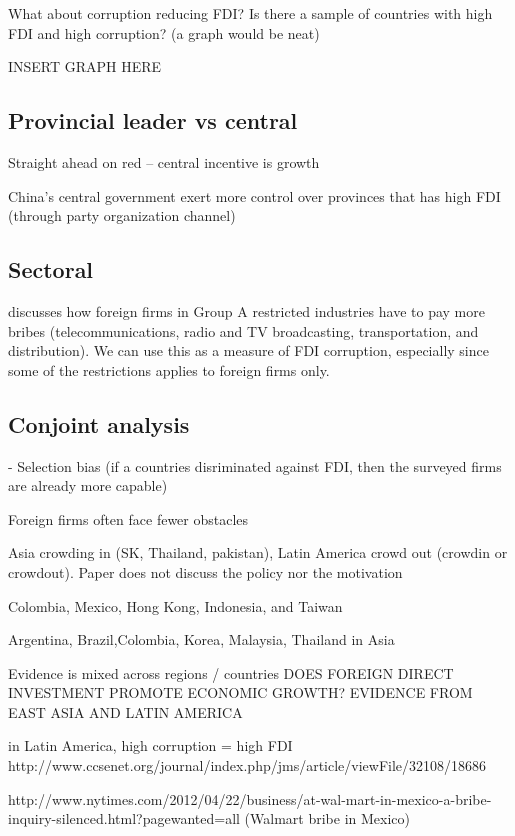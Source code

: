 \documentclass[12pt]{article}
\begin{document}
What about corruption reducing FDI? Is there a sample of countries with high FDI and high corruption? (a graph would be neat)

INSERT GRAPH HERE


\subsection{Provincial leader vs central}

\citep{Malesky2008} Straight ahead on red -- central incentive is growth

\citep{Sheng2007} China's central government exert more control over provinces that has high FDI (through party organization channel)

\subsection{Sectoral}

\citep{Malesky2015} discusses how foreign firms in Group A restricted industries have to pay more bribes (telecommunications, radio and TV broadcasting, transportation, and distribution). We can use this as a measure of FDI corruption, especially since some of the restrictions applies to foreign firms only.


\subsection{Conjoint analysis}



- Selection bias (if a countries disriminated against FDI, then the surveyed firms are already more capable)



Foreign firms often face fewer obstacles

Asia crowding in (SK, Thailand, pakistan), Latin America crowd out (crowdin or crowdout). Paper does not discuss the policy nor the motivation

Colombia, Mexico, Hong Kong, Indonesia, and Taiwan

Argentina, Brazil,Colombia, Korea, Malaysia, Thailand in Asia

Evidence is mixed across regions / countries DOES FOREIGN DIRECT INVESTMENT PROMOTE ECONOMIC GROWTH? EVIDENCE FROM EAST ASIA AND LATIN AMERICA 

in Latin America, high corruption = high FDI http://www.ccsenet.org/journal/index.php/jms/article/viewFile/32108/18686

http://www.nytimes.com/2012/04/22/business/at-wal-mart-in-mexico-a-bribe-inquiry-silenced.html?pagewanted=all (Walmart bribe in Mexico)

\clearpage


\end{document}
